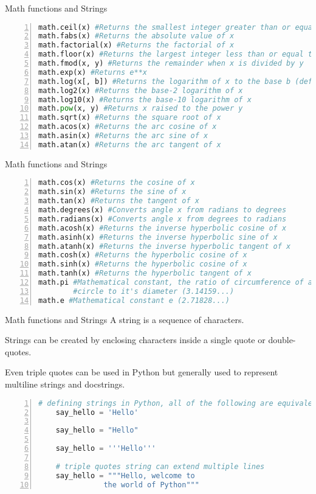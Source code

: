 \begin{frame}[fragile]{Math functions and Strings}
\begin{lstlisting}[numbers=left,showstringspaces=false,language=python]
math.ceil(x) #Returns the smallest integer greater than or equal to x.
math.fabs(x) #Returns the absolute value of x
math.factorial(x) #Returns the factorial of x
math.floor(x) #Returns the largest integer less than or equal to x
math.fmod(x, y) #Returns the remainder when x is divided by y
math.exp(x) #Returns e**x
math.log(x[, b]) #Returns the logarithm of x to the base b (defaults to e)
math.log2(x) #Returns the base-2 logarithm of x
math.log10(x) #Returns the base-10 logarithm of x
math.pow(x, y) #Returns x raised to the power y
math.sqrt(x) #Returns the square root of x
math.acos(x) #Returns the arc cosine of x
math.asin(x) #Returns the arc sine of x
math.atan(x) #Returns the arc tangent of x
\end{lstlisting}
\end{frame}
\begin{frame}[fragile]{Math functions and Strings}
    \begin{lstlisting}[numbers=left,showstringspaces=false,language=python]
math.cos(x) #Returns the cosine of x
math.sin(x) #Returns the sine of x
math.tan(x) #Returns the tangent of x
math.degrees(x)	#Converts angle x from radians to degrees
math.radians(x)	#Converts angle x from degrees to radians
math.acosh(x) #Returns the inverse hyperbolic cosine of x
math.asinh(x) #Returns the inverse hyperbolic sine of x
math.atanh(x) #Returns the inverse hyperbolic tangent of x
math.cosh(x) #Returns the hyperbolic cosine of x
math.sinh(x) #Returns the hyperbolic cosine of x
math.tanh(x) #Returns the hyperbolic tangent of x
math.pi	#Mathematical constant, the ratio of circumference of a 
        #circle to it's diameter (3.14159...)
math.e #Mathematical constant e (2.71828...)
\end{lstlisting}
\end{frame}
\begin{frame}[fragile]{Math functions and Strings}
    A string is a sequence of characters.

    Strings can be created by enclosing characters inside a single quote or double-quotes.
    
    
    Even triple quotes can be used in Python but generally used to represent multiline strings and docstrings.
\begin{lstlisting}[numbers=left,showstringspaces=false,language=python]
    # defining strings in Python, all of the following are equivalent
    say_hello = 'Hello'

    say_hello = "Hello"

    say_hello = '''Hello'''
    
    # triple quotes string can extend multiple lines
    say_hello = """Hello, welcome to
               the world of Python"""
\end{lstlisting}
\end{frame}
